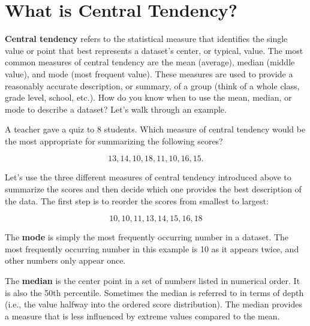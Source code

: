 \documentclass[
  letterpaper,
  DIV=11,
  numbers=noendperiod]{scrreprt}
\begin{document}
\section{What is Central Tendency?}\label{what-is-central-tendency}

\textbf{Central tendency} refers to the statistical measure that
identifies the single value or point that best represents a dataset's
center, or typical, value. The most common measures of central tendency
are the mean (average), median (middle value), and mode (most frequent
value). These measures are used to provide a reasonably accurate
description, or summary, of a group (think of a whole class, grade
level, school, etc.). How do you know when to use the mean, median, or
mode to describe a dataset? Let's walk through an example.

A teacher gave a quiz to 8 students. Which measure of central tendency
would be the most appropriate for summarizing the following scores?

\[
13, 14, 10, 18, 11, 10, 16, 15. 
\]

Let's use the three different measures of central tendency introduced
above to summarize the scores and then decide which one provides the
best description of the data. The first step is to reorder the scores
from smallest to largest:

\[
10, 10, 11, 13, 14, 15, 16, 18 
\]

The \textbf{mode} is simply the most frequently occurring number in a
dataset. The most frequently occurring number in this example is 10 as
it appears twice, and other numbers only appear once.

The \textbf{median} is the center point in a set of numbers listed in
numerical order. It is also the 50th percentile. Sometimes the median is
referred to in terms of depth (i.e., the value halfway into the ordered
score distribution). The median provides a measure that is less
influenced by extreme values compared to the mean.
\end{document}
